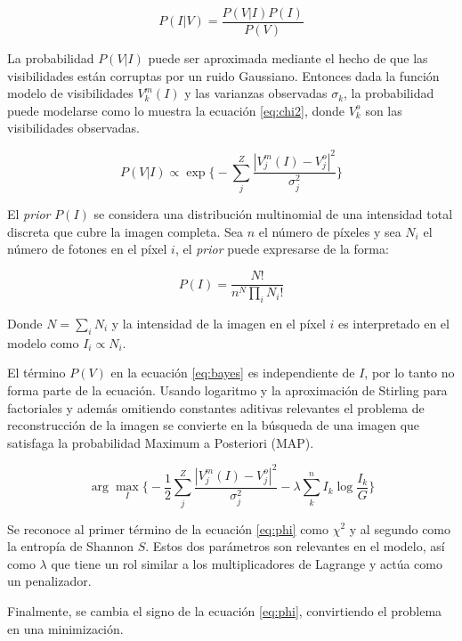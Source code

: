\begin{equation}
	P(I|V) = \frac{P(V|I)P(I)}{P(V)}
	\label{eq:bayes}
\end{equation}

La probabilidad $P(V|I)$ puede ser aproximada mediante el hecho de que las visibilidades están corruptas por un ruido Gaussiano. Entonces dada la función modelo de visibilidades $V_{k}^{m}(I)$ y las varianzas observadas $\sigma_k$, la probabilidad puede modelarse como lo muestra la ecuación \ref{eq:chi2}, donde $V_{k}^{o}$ son las visibilidades observadas.

\begin{equation}
	P(V|I) \propto \exp\biggl\{-\sum_j^{Z}{\frac{|V^m_j(I)-V^o_j|^{2}}{\sigma_j^{2}}}\biggr\}
	\label{eq:chi2}
\end{equation}

El \textit{prior} $P(I)$ se considera una distribución multinomial de una intensidad total discreta que cubre la imagen completa. Sea $n$ el número de píxeles y sea $N_{i}$ el número de fotones en el píxel $i$, el \textit{prior} puede expresarse de la forma:

\begin{equation}
	P(I) = \frac{N!}{n^N\prod_i{N_i!}}
	\label{eq:imageProb}
\end{equation}

Donde $N=\sum_i N_{i}$ y la intensidad de la imagen en el píxel $i$ es interpretado en el modelo como $I_{i} \propto N_{i}$.

El término $P(V)$ en la ecuación \ref{eq:bayes} es independiente de $I$, por lo tanto no forma parte de la ecuación. Usando logaritmo y la aproximación de Stirling para factoriales y además omitiendo constantes aditivas relevantes el problema de reconstrucción de la imagen se convierte en la búsqueda de una imagen que satisfaga la probabilidad Maximum a Posteriori (MAP).

\begin{equation}
	\arg \max_{I} \biggl\{
	-\frac{1}{2} \sum_j^{Z}{ \frac{|V^m_j(I)-V^o_j|^{2}}{\sigma_j^2} }-
	\lambda \sum_k^{n}{I_k \log{\frac{I_k}{G}}}
	\biggr\}
	\label{eq:phi}
\end{equation}

Se reconoce al primer término de la ecuación \ref{eq:phi} como $\chi^{2}$ y al segundo como la entropía de Shannon $S$. Estos dos parámetros son relevantes en el modelo, así como $\lambda$ que tiene un rol similar a los multiplicadores de Lagrange y actúa como un penalizador.

Finalmente, se cambia el signo de la ecuación \ref{eq:phi}, convirtiendo el problema en una minimización.

